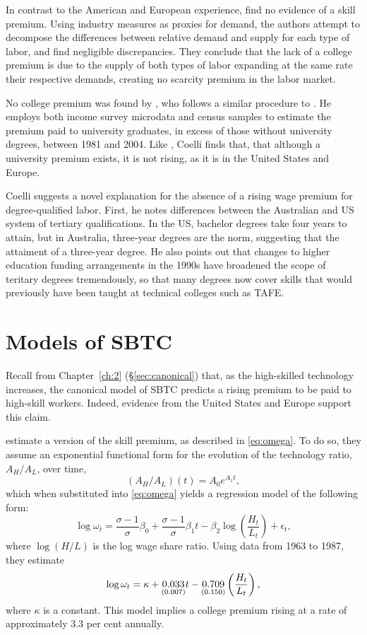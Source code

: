 In contrast to the American and European experience, \citet{Barnes2002} find no evidence of a skill premium. Using industry measures as proxies for demand, the authors attempt to decompose the differences between relative demand and supply for each type of labor, and find negligible discrepancies. They conclude that the lack of a college premium  is due to the supply of both types of labor expanding at the same rate their respective demands, creating no scarcity premium in the labor market.

No college premium was found by \citet{Coelli2009}, who follows a similar procedure to \citet{Katz1992}. He employs both income survey microdata and census samples to estimate the premium paid to university graduates, in excess of those without university degrees, between 1981 and 2004. Like \citet{Barnes2002}, Coelli finds that, that although a university premium exists, it is not rising, as it is in the United States and Europe.

Coelli suggests a novel explanation for the absence of a rising wage premium for degree-qualified labor. First, he notes differences between the Australian and US system of tertiary qualifications. In the US, bachelor degrees take four years to attain, but in Australia, three-year degrees are the norm, suggesting that the attaiment of a three-year degree. He also points out that changes to higher education funding arrangements in the 1990s have broadened the scope of teritary degrees tremendously, so that many degrees now cover skills that would previously have been taught at technical colleges such as TAFE.

\section{Models of SBTC}

Recall from Chapter~\ref{ch:2} (\S\ref{sec:canonical}) that, as the high-skilled technology increases, the canonical model of SBTC predicts a rising premium to be paid to high-skill workers. Indeed, evidence from the United States and Europe support this claim.

\citet{Katz1992} estimate a version of the skill premium, as described in \eqref{eq:omega}. To do so, they assume an exponential functional form for the evolution of the technology ratio, $A_H/A_L$, over time,
$$  (A_H/A_L)(t) = A_{0}e^{A_1t}, $$
which when substituted into \eqref{eq:omega} yields a regression model of the following form:
\begin{equation}\label{eq:regcanonical}
\log \omega_t = \frac{\sigma - 1}{\sigma}\beta_0 + \frac{\sigma-1}{\sigma}\beta_1t - \beta_2\log\left(\frac{H_t}{L_t}\right) + \epsilon_t,
\end{equation}
where $\log(H/L)$ is the log wage share ratio. Using data from 1963 to 1987, they estimate
$$
  \log \omega_t = \kappa + \underset{\scriptsize (0.007)}{0.033} t - \underset{\scriptsize (0.150)}{0.709}\left( \frac{H_t}{L_t} \right),
$$
where $\kappa$ is a constant. This model implies a college premium rising at a rate of approximately 3.3 per cent annually.

